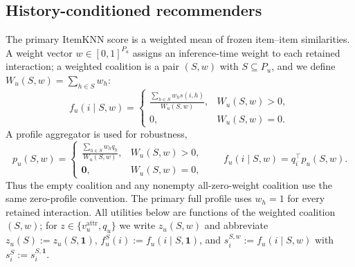 \documentclass[manuscript,screen,review,anonymous]{acmart}
\begin{document}
\subsection{History-conditioned recommenders}
The primary ItemKNN score is a weighted mean of frozen item--item similarities. A weight vector $w\in[0,1]^{P_u}$ assigns an inference-time weight to each retained interaction; a weighted coalition is a pair $(S,w)$ with $S\subseteq P_u$, and we define $W_u(S,w)=\sum_{h\in S}w_h$:
\begin{equation}
f_u(i\mid S,w)=
\begin{cases}
\displaystyle\frac{\sum_{h\in S}w_hs(i,h)}{W_u(S,w)},&W_u(S,w)>0,\\[6pt]
0,&W_u(S,w)=0.
\end{cases}
\label{eq:itemknn-weighted}
\end{equation}
A profile aggregator is used for robustness,
\begin{equation}
p_u(S,w)=
\begin{cases}
\displaystyle\frac{\sum_{h\in S}w_hq_h}{W_u(S,w)},&W_u(S,w)>0,\\[6pt]
\mathbf 0,&W_u(S,w)=0,
\end{cases}
\qquad f_u(i\mid S,w)=q_i^\top p_u(S,w).
\label{eq:profile-weighted}
\end{equation}
Thus the empty coalition and any nonempty all-zero-weight coalition use the same zero-profile convention. The primary full profile uses $w_h=1$ for every retained interaction. All utilities below are functions of the weighted coalition $(S,w)$; for $z\in\{v_u^{\mathrm{attr}},q_u\}$ we write $z_u(S,w)$ and abbreviate $z_u(S):=z_u(S,\mathbf{1})$, $f_u^S(i):=f_u(i\mid S,\mathbf{1})$, and $s_i^{S,w}:=f_u(i\mid S,w)$ with $s_i^S:=s_i^{S,\mathbf{1}}$.
\end{document}
